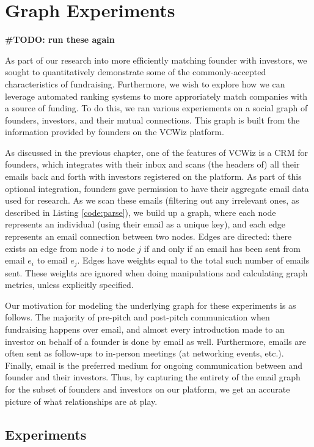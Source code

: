 \chapter{Graph Experiments}

\textbf{\#TODO: run these again}

As part of our research into more efficiently matching founder with investors, we sought to quantitatively demonstrate some of the commonly-accepted characteristics of fundraising. Furthermore, we wish to explore how we can leverage automated ranking systems to more approriately match companies with a source of funding. To do this, we ran various experiements on a social graph of founders, investors, and their mutual connections. This graph is built from the information provided by founders on the VCWiz platform.

As discussed in the previous chapter, one of the features of VCWiz is a CRM for founders, which integrates with their inbox and scans (the headers of) all their emails back and forth with investors registered on the platform. As part of this optional integration, founders gave permission to have their aggregate email data used for research. As we scan these emails (filtering out any irrelevant ones, as described in Listing \ref{code:parse}), we build up a graph, where each node represents an individual (using their email as a unique key), and each edge represents an email connection between two nodes. Edges are directed: there exists an edge from node $i$ to node $j$ if and only if an email has been sent from email $e_i$ to email $e_j$. Edges have weights equal to the total such number of emails sent. These weights are ignored when doing manipulations and calculating graph metrics, unless explicitly specified.

Our motivation for modeling the underlying graph for these experiments is as follows. The majority of pre-pitch and post-pitch communication when fundraising happens over email, and almost every introduction made to an investor on behalf of a founder is done by email as well. Furthermore, emails are often sent as follow-ups to in-person meetings (at networking events, etc.). Finally, email is the preferred medium for ongoing communication between and founder and their investors. Thus, by capturing the entirety of the email graph for the subset of founders and investors on our platform, we get an accurate picture of what relationships are at play.

\section{Experiments}

